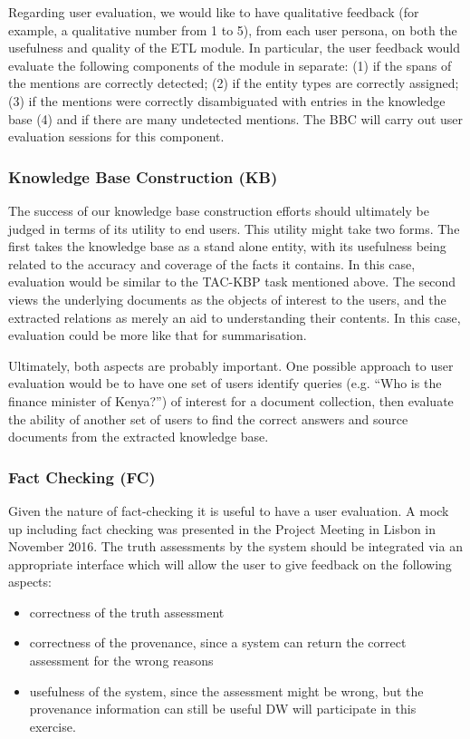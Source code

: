 Regarding user evaluation, we would like to have qualitative feedback (for example, a qualitative number from 1 to 5), from each user persona, on both the usefulness and quality of the ETL module. In particular, the user feedback would evaluate the following components of the module in separate: (1) if the spans of the mentions are correctly detected; (2) if the entity types are correctly assigned; (3) if the mentions were correctly disambiguated with entries in the knowledge base (4) and if there are many undetected mentions. The BBC will carry out user evaluation sessions for this component.

\subsubsection{Knowledge Base Construction (KB)}

The success of our knowledge base construction efforts should ultimately be judged in terms of its utility to end users. This utility might take two forms. The first takes the knowledge base as a stand alone entity, with its usefulness being related to the accuracy and coverage of the facts it contains. In this case, evaluation would be similar to the TAC-KBP task mentioned above. The second views the underlying documents as the objects of interest to the users, and the extracted relations as merely an aid to understanding their contents. In this case, evaluation could be more like that for summarisation.

Ultimately, both aspects are probably important. One possible approach to user evaluation would be to have one set of users identify queries (e.g. ``Who is the finance minister of Kenya?'') of interest for a document collection, then evaluate the ability of another set of users to find the correct answers and source documents from the extracted knowledge base.

\subsubsection{Fact Checking (FC)}\label{sec:validation-fact-checking}

Given the nature of fact-checking it is useful to have a user evaluation. A mock up including fact checking was presented in the Project Meeting in Lisbon in November 2016. The truth assessments by the system should be integrated via an appropriate interface which will allow the user to give feedback on the following aspects:
\begin{itemize}
\item correctness of the truth assessment
\item correctness of the provenance, since a system can return the correct assessment for the wrong reasons
\item usefulness of the system, since the assessment might be wrong, but the provenance information can still be useful
DW will participate in this exercise.
\end{itemize}

